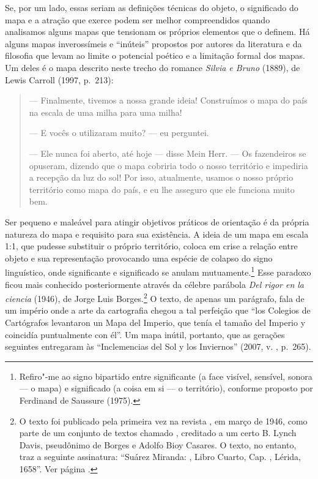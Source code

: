 Se, por um lado, essas seriam as definições técnicas do objeto, o
significado do mapa e a atração que exerce podem ser melhor
compreendidos quando analisamos alguns mapas que tensionam os próprios
elementos que o definem. Há alguns mapas inverossímeis e ``inúteis''
propostos por autores da literatura e da filosofia que levam ao limite o
potencial poético e a limitação formal dos mapas. Um deles é o mapa
descrito neste trecho do romance \emph{Silvia e Bruno} (1889), de Lewis Carroll (1997, p.~213):

\begin{quote}
--- Finalmente, tivemos a nossa grande ideia! Construímos o mapa do país
na escala de uma milha para uma milha!

--- E vocês o utilizaram muito? --- eu perguntei.

--- Ele nunca foi aberto, até hoje --- disse Mein Herr. --- Os fazendeiros
se opuseram, dizendo que o mapa cobriria todo o nosso território e
impediria a recepção da luz do sol! Por isso, atualmente, usamos o nosso
próprio território como mapa do país, e eu lhe asseguro que ele funciona
muito bem.
\end{quote}

Ser pequeno e maleável para atingir objetivos práticos de orientação é
da própria natureza do mapa e requisito para sua existência. A ideia de
um mapa em escala 1:1, que pudesse substituir o próprio território,
coloca em crise a relação entre objeto e sua representação provocando
uma espécie de colapso do signo linguístico, onde significante e
significado se anulam mutuamente.\footnote{Refiro"-me ao signo bipartido
  entre significante (a face visível, sensível, sonora --- o mapa) e
  significado (a coisa em si --- o território), conforme proposto por
  Ferdinand de Saussure (1975).} Esse paradoxo ficou mais conhecido
posteriormente através da célebre parábola \emph{Del rigor en la
ciencia} (1946), de Jorge Luis Borges.\footnote{O texto foi publicado
  pela primeira vez na revista {}, em
  março de 1946, como parte de um conjunto de textos chamado
  {}, creditado a um certo B. Lynch Davis, pseudônimo de
  Borges e Adolfo Bioy Casares. O texto, no entanto, traz a seguinte
  assinatura: ``Suárez Miranda: {},
  Libro Cuarto, Cap. , Lérida, 1658''. Ver página .} O texto, de apenas um parágrafo, fala de um império onde a arte da cartografia
chegou a tal perfeição que ``los Colegios de Cartógrafos levantaron un
Mapa del Imperio, que tenía el tamaño del Imperio y coincidía
puntualmente con él''. Um mapa inútil, portanto, que as gerações
seguintes entregaram às ``Inclemencias del Sol y los Inviernos'' (2007,
v. , p.~265).

